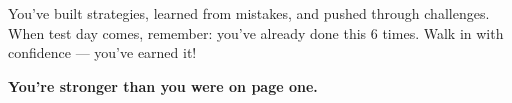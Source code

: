 {\begin{tcolorbox}[
    enhanced,
    colback=funGreenLight,
    colframe=funGreen!50,
    arc=10pt,
    boxrule=1pt,
    left=6mm, right=6mm, top=4mm, bottom=4mm,
]
\vspace{2mm}

You've built strategies, learned from mistakes, and pushed through challenges. When test day comes, remember: you've already done this 6 times. Walk in with confidence — you've earned it!
\end{tcolorbox}

\vspace{4mm}

\begin{center}
{\large\bfseries\color{funPinkDark} \faMedal\hspace{2mm}You're stronger than you were on page one.\hspace{2mm}\faMedal}
\end{center}

}
\newpage
